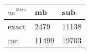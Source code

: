 \begin{tabular}{lll}
    \toprule
    $_{\text{\tiny{\ggn}}}$$^{\text{\tiny{Data}}}$ & mb & sub \\
    \midrule
    exact & 2479
              & 11138 \\
    mc   & 11499
              & 19703 \\
    \bottomrule
\end{tabular}